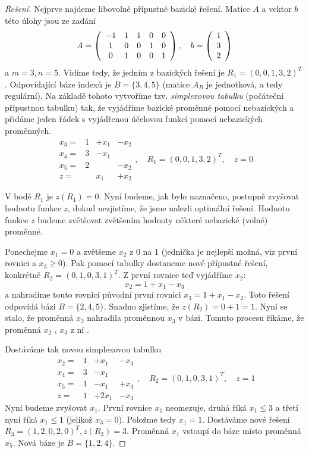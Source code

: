 \begin{proof}[Řešení]
Nejprve najdeme libovolné přípustné bazické řešení. Matice $A$ a vektor $b$ této úlohy jsou ze zadání
\[
A=
\left(
\begin{array}[h]{ccccc}
-1 & 1 & 1 & 0 & 0      \\
1 & 0 & 0 & 1 & 0       \\
0 & 1 & 0 & 0 & 1
\end{array}\right),\quad
b=\left(\begin{array}[h]{c}
   1 \\ 3 \\ 2
  \end{array}\right)
\]
a $m=3, n=5$. Vidíme tedy, že jedním z bazických řešení je $R_1 = (0,0,1,3,2)^T$. Odpovídající
báze indexů je $B=\{3,4,5\}$ (matice $A_B$ je jednotková, a tedy regulární). Na základě tohoto
vytvoříme tzv. {\it simplexovou tabulku} (počáteční přípustnou tabulku) tak, že vyjádříme bazické proměnné
pomocí nebazických a přidáme jeden řádek s vyjádřenou účelovou funkcí pomocí nebazických proměnných.
\[
\begin{array}{c|ccc}
x_3=& 1 & +x_1 & -x_2   \\
x_4=& 3 & -x_1 &        \\
x_5=& 2 & & -x_2        \\
\hline
z=& & x_1 & +x_2
\end{array}, \quad R_1 = (0,0,1,3,2)^T, \quad z=0
\]

V bodě $R_1$ je $z(R_1) = 0$. Nyní budeme, jak bylo naznačeno, postupně zvyšovat
hodnotu funkce $z$, dokud nezjistíme, že jsme nalezli optimální řešení. Hodnotu funkce $z$ budeme
zvětšovat zvětšením hodnoty některé nebazické (volné) proměnné.

Ponechejme $x_1=0$ a zvětšeme $x_2$ z $0$ na $1$ (jednička je nejlepší možná, viz první rovnici a $x_3\geq 0$).
Pak pomocí tabulky dostaneme nové přípustné řešení, konkrétně $R_2=(0,1,0,3,1)^T$. Z první rovnice teď
vyjádříme $x_2$:
\[
x_2 = 1+x_1-x_3
\]
a nahradíme touto rovnicí původní první rovnici $x_3=1+x_1-x_2$. Toto řešení odpovídá bázi $B=\{2,4,5\}$.
Snadno zjistíme, že $z(R_2) = 0+1 = 1$. Nyní se stalo, že proměnná $x_2$ nahradila proměnnou $x_3$ v bázi.
Tomuto procesu říkáme, že proměnná $x_2$ , $x_3$ z ní .
\smallskip

Dostáváme tak novou simplexovou tabulku
\[
\begin{array}{c|ccc}
x_2=& 1 & +x_1 & -x_3   \\
x_4=& 3 & -x_1 &        \\
x_5=& 1 & -x_1& +x_3        \\
\hline
z=& 1& +2x_1 & -x_3
\end{array}, \quad R_2=(0,1,0,3,1)^T, \quad z=1
\]
Nyní budeme zvyšovat $x_1$. První rovnice $x_1$ neomezuje, druhá říká $x_1\leq 3$ a třetí nyní říká $x_1\leq 1$
(jelikož $x_3=0$). Položme tedy $x_1=1$. Dostáváme nové řešení $R_3=(1,2,0,2,0)^T, z(R_3) = 3$. Proměnná
$x_1$ vstoupí do báze místo proměnná $x_5$. Nová báze je $B=\{1,2,4\}$.
\smallskip


\end{proof}
